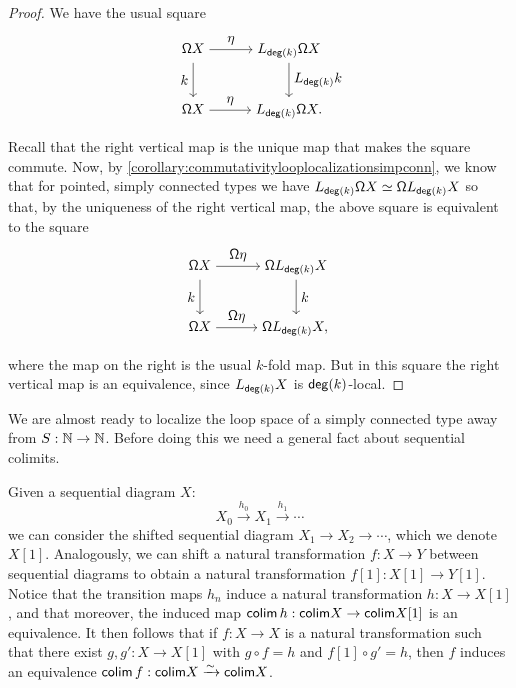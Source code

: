 \begin{proof}
    We have the usual square
    \[
        \begin{tikzpicture}
          \matrix (m) [matrix of math nodes,row sep=2.5em,column sep=3em,minimum width=2em]
          { \loopspacesym X \strut & L_{\degg(k)} \loopspacesym X \strut \\
            \loopspacesym X \strut & L_{\degg(k)} \loopspacesym X . \strut \\};
          \path[->]
            (m-1-1) edge node [above] {$\eta$} (m-1-2)
                    edge node [left] {$k$} (m-2-1)
            (m-2-1) edge node [above] {$\eta$} (m-2-2)
            (m-1-2) edge node [right]{$L_{\degg(k)} k$} (m-2-2)
            ;
        \end{tikzpicture}
    \]
    Recall that the right vertical map is the unique map that makes the square commute.
    Now, by \cref{corollary:commutativitylooplocalizationsimpconn}, we know that for pointed, simply connected types we have
    $L_{\mathsf{deg}(k)} \mathsf{\Omega} X \simeq \mathsf{\Omega} L_{\mathsf{deg}(k)} X$ so that,
    by the uniqueness of the right vertical map, the above square is equivalent to the square
    \[
        \begin{tikzpicture}
          \matrix (m) [matrix of math nodes,row sep=2.5em,column sep=3em,minimum width=2em]
          { \loopspacesym X \strut & \loopspacesym L_{\degg(k)} X \strut \\
            \loopspacesym X \strut & \loopspacesym L_{\degg(k)} X , \strut \\};
          \path[->]
            (m-1-1) edge node [above] {$\loopspacesym \eta$} (m-1-2)
                    edge node [left] {$k$} (m-2-1)
            (m-2-1) edge node [above] {$\loopspacesym \eta$} (m-2-2)
            (m-1-2) edge node [right]{$k$} (m-2-2)
            ;
        \end{tikzpicture}
    \]
    where the map on the right is the usual $k$-fold map.
    But in this square the right vertical map is an equivalence, since $L_{\mathsf{deg}(k)} X$
    is $\mathsf{deg}(k)$-local.
\end{proof}

We are almost ready to localize the loop space of a simply connected type away from $S : \mathbb{N} \to \mathbb{N}$.
Before doing this we need a general fact about sequential colimits.

\begin{rmk}\label{remark:equivalenceofseqcolim}
Given a sequential diagram $X$:
\[
    X_0 \xrightarrow{h_0} X_1 \xrightarrow{h_1} \cdots
\]
we can consider the shifted sequential diagram $X_1 \to X_2 \to \cdots$, which we denote $X[1]$.
Analogously, we can shift a natural transformation $f : X \to Y$ between sequential
diagrams to obtain a natural transformation $f[1] : X[1] \to Y[1]$.
Notice that the transition maps $h_n$ induce a natural transformation $h : X \to X[1]$, and that moreover, the
induced map $\mathsf{colim}\, h : \mathsf{colim} X \to \mathsf{colim} X[1]$ is an equivalence.
It then follows that if $f : X \to X$ is a natural transformation such that there exist $g, g' : X \to X[1]$
with $g \circ f = h$ and $f[1] \circ g' = h$, then $f$ induces an equivalence $\mathsf{colim}\, f : \mathsf{colim} X \xrightarrow{\sim} \mathsf{colim} X$.
\end{rmk}

